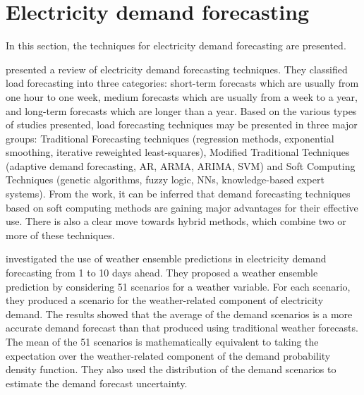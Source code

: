 \cite{8955514}

\cite{Gijsbers2019}

\cite{9660073}

\cite{9564380}

\cite{9534091}

\cite{su142215292}


\cite{Feurer2020}

\cite{Zimmer2020}

\cite{Deng2022}


\section{Electricity demand forecasting}
\label{sec:demandsoa}
\vspace{0.2 cm}

In this section, the techniques for electricity demand forecasting are presented.

\cite{singh2013overview} presented a review of electricity demand forecasting techniques.
They classified load forecasting into three categories:
short-term forecasts which are usually from one hour to one week,
medium forecasts which are usually from a week to a year,
and long-term forecasts which are longer than a year.
Based on the various types of studies presented, load forecasting techniques may be presented in three major groups: Traditional Forecasting techniques (regression methods, exponential smoothing, iterative reweighted least-squares), Modified Traditional Techniques (adaptive demand forecasting, AR, ARMA, ARIMA, SVM) and Soft Computing Techniques (genetic algorithms, fuzzy logic, NNs, knowledge-based expert systems).
From the work, it can be inferred that demand forecasting techniques based on soft computing methods are gaining major advantages for their effective use.
There is also a clear move towards hybrid methods, which combine two or more of these techniques.

\cite{TAYLOR200357} investigated the use of weather ensemble predictions in electricity demand forecasting from 1 to 10 days ahead.
They proposed a weather ensemble prediction by considering 51 scenarios for a weather variable.
For each scenario, they produced a scenario for the weather-related component of electricity demand.
The results showed that the average of the demand scenarios is a more accurate demand forecast than that produced using traditional weather forecasts.
The mean of the 51 scenarios is mathematically equivalent to taking the expectation over the weather-related component of the demand probability density function.
They also used the distribution of the demand scenarios to estimate the demand forecast uncertainty.

